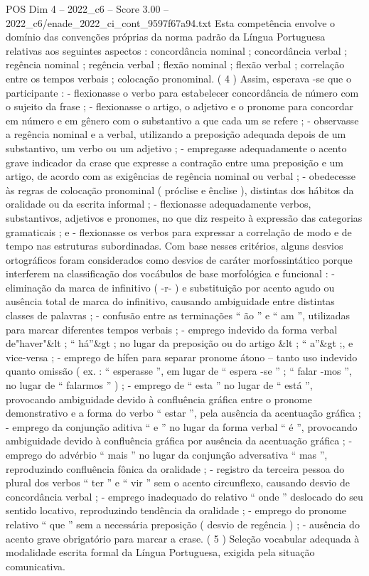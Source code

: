 \begin{textsample}{POS Dim 4 – 2022\_c6 – Score 3.00 – 2022\_c6/enade\_2022\_ci\_cont\_9597f67a94.txt}
Esta competência envolve o domínio das convenções próprias da norma padrão da Língua Portuguesa relativas aos seguintes aspectos : concordância nominal ; concordância verbal ; regência nominal ; regência verbal ; flexão nominal ; flexão verbal ; correlação entre os tempos verbais ; colocação pronominal. ( 4 ) Assim, esperava -se que o participante : - flexionasse o verbo para estabelecer concordância de número com o sujeito da frase ; - flexionasse o artigo, o adjetivo e o pronome para concordar em número e em gênero com o substantivo a que cada um se refere ; - observasse a regência nominal e a verbal, utilizando a preposição adequada depois de um substantivo, um verbo ou um adjetivo ; - empregasse adequadamente o acento grave indicador da crase que expresse a contração entre uma preposição e um artigo, de acordo com as exigências de regência nominal ou verbal ; - obedecesse às regras de colocação pronominal ( próclise e ênclise ), distintas dos hábitos da oralidade ou da escrita informal ; - flexionasse adequadamente verbos, substantivos, adjetivos e pronomes, no que diz respeito à expressão das categorias gramaticais ; e - flexionasse os verbos para expressar a correlação de modo e de tempo nas estruturas subordinadas.
Com base nesses critérios, alguns desvios ortográficos foram considerados como desvios de caráter morfossintático porque interferem na classificação dos vocábulos de base morfológica e funcional : - eliminação da marca de infinitivo ( -r- ) e substituição por acento agudo ou ausência total de marca do infinitivo, causando ambiguidade entre distintas classes de palavras ; - confusão entre as terminações “ ão ” e “ am ”, utilizadas para marcar diferentes tempos verbais ; - emprego indevido da forma verbal de"haver"\&lt ; “ há”\&gt ; no lugar da preposição ou do artigo \&lt ; “ a”\&gt ;, e vice-versa ; - emprego de hífen para separar pronome átono – tanto uso indevido quanto omissão ( ex. : “ esperasse ”, em lugar de “ espera -se ” ; “ falar -mos ”, no lugar de “ falarmos ” ) ; - emprego de “ esta ” no lugar de “ está ”, provocando ambiguidade devido à confluência gráfica entre o pronome demonstrativo e a forma do verbo “ estar ”, pela ausência da acentuação gráfica ; - emprego da conjunção aditiva “ e ” no lugar da forma verbal “ é ”, provocando ambiguidade devido à confluência gráfica por ausência da acentuação gráfica ; - emprego do advérbio “ mais ” no lugar da conjunção adversativa “ mas ”, reproduzindo confluência fônica da oralidade ; - registro da terceira pessoa do plural dos verbos “ ter ” e “ vir ” sem o acento circunflexo, causando desvio de concordância verbal ; - emprego inadequado do relativo “ onde ” deslocado do seu sentido locativo, reproduzindo tendência da oralidade ; - emprego do pronome relativo “ que ” sem a necessária preposição ( desvio de regência ) ; - ausência do acento grave obrigatório para marcar a crase. ( 5 ) Seleção vocabular adequada à modalidade escrita formal da Língua Portuguesa, exigida pela situação comunicativa.

\end{textsample}
